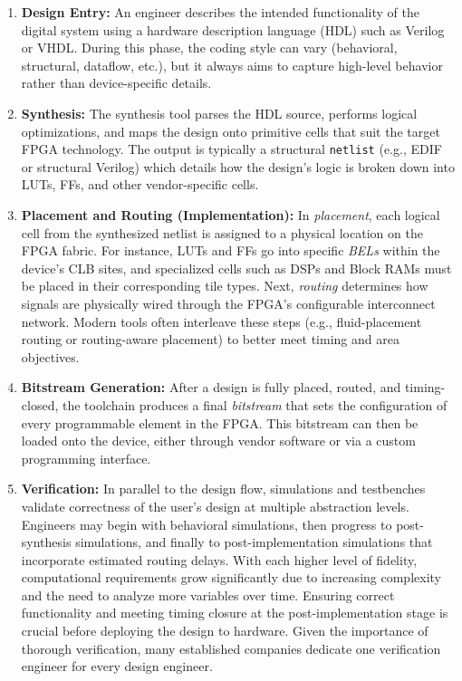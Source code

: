 \begin{enumerate}
\item \textbf{Design Entry:} 
    An engineer describes the intended functionality of the digital system using a hardware description language (HDL) such as Verilog or VHDL. 
    During this phase, the coding style can vary (behavioral, structural, dataflow, etc.), but it always aims to capture high-level behavior rather than device-specific details.

\item \textbf{Synthesis:} 
    The synthesis tool parses the HDL source, performs logical optimizations, and maps the design onto primitive cells that suit the target FPGA technology. 
    The output is typically a structural \texttt{netlist} (e.g., EDIF or structural Verilog) which details how the design’s logic is broken down into LUTs, FFs, and other vendor-specific cells.

\item \textbf{Placement and Routing (Implementation):} 
    In \emph{placement}, each logical cell from the synthesized netlist is assigned to a physical location on the FPGA fabric. 
    For instance, LUTs and FFs go into specific \emph{BELs} within the device’s CLB sites, and specialized cells such as DSPs and Block RAMs must be placed in their corresponding tile types. 
    Next, \emph{routing} determines how signals are physically wired through the FPGA’s configurable interconnect network. 
    Modern tools often interleave these steps (e.g., fluid-placement routing or routing-aware placement) to better meet timing and area objectives.

\item \textbf{Bitstream Generation:} 
    After a design is fully placed, routed, and timing-closed, the toolchain produces a final \emph{bitstream} that sets the configuration of every programmable element in the FPGA. 
    This bitstream can then be loaded onto the device, either through vendor software or via a custom programming interface.

\item \textbf{Verification:} 
    In parallel to the design flow, simulations and testbenches validate correctness of the user's design at multiple abstraction levels. 
    Engineers may begin with behavioral simulations, then progress to post-synthesis simulations, and finally to post-implementation simulations that incorporate estimated routing delays. 
    With each higher level of fidelity, computational requirements grow significantly due to increasing complexity and the need to analyze more variables over time. 
    Ensuring correct functionality and meeting timing closure at the post-implementation stage is crucial before deploying the design to hardware. 
    Given the importance of thorough verification, many established companies dedicate one verification engineer for every design engineer.

\end{enumerate}

